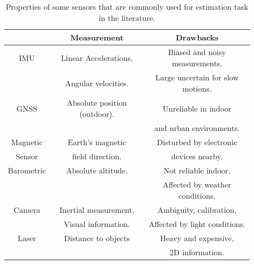 \begin{table}[ht]
	\centering
	\setlength{\tabcolsep}{4pt} %
	\renewcommand{\arraystretch}{1.5} %
	\begin{tabular}{|c|c|c|}
		\toprule
		& \textbf{Measurement} & \textbf{Drawbacks} \\
		\midrule
		IMU & Linear Accelerations, & Biased and noisy measurements, \\
		& Angular velocities.   & Large uncertain for slow motions.\\
		
		\midrule
		GNSS & Absolute position (outdoor). & Unreliable in indoor \\
		&                              & and urban environments. \\
		\midrule
		Magnetic  & Earth's magnetic  & Disturbed by electronic \\
		Sensor    & field direction.  & devices nearby. \\
		\midrule
		Barometric & Absolute altitude. & Not reliable indoor, \\
		&					& Affected by weather conditions. \\
		\midrule							   
		Camera & Inertial measurement, & Ambiguity, calibration, \\
		& Visual information.   & Affected by light conditions. \\
		
		\midrule
		Laser & Distance to objects & Heavy and expensive, \\
		&  					& 2D information. \\
		\bottomrule
	\end{tabular}
	\caption{Properties of some sensors that are commonly used for estimation task in the literature.}
	\label{sensors_table}
\end{table}

